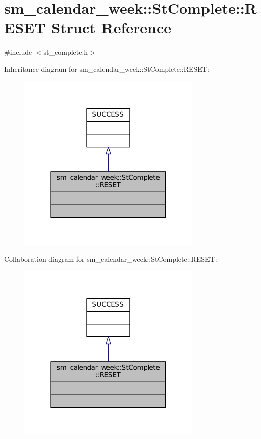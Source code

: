 \hypertarget{structsm__calendar__week_1_1StComplete_1_1RESET}{}\section{sm\+\_\+calendar\+\_\+week\+:\+:St\+Complete\+:\+:R\+E\+S\+ET Struct Reference}
\label{structsm__calendar__week_1_1StComplete_1_1RESET}


{\ttfamily \#include $<$st\+\_\+complete.\+h$>$}



Inheritance diagram for sm\+\_\+calendar\+\_\+week\+:\+:St\+Complete\+:\+:R\+E\+S\+ET\+:
\nopagebreak
\begin{figure}[H]
\begin{center}
\leavevmode
\includegraphics[width=250pt]{structsm__calendar__week_1_1StComplete_1_1RESET__inherit__graph}
\end{center}
\end{figure}


Collaboration diagram for sm\+\_\+calendar\+\_\+week\+:\+:St\+Complete\+:\+:R\+E\+S\+ET\+:
\nopagebreak
\begin{figure}[H]
\begin{center}
\leavevmode
\includegraphics[width=250pt]{structsm__calendar__week_1_1StComplete_1_1RESET__coll__graph}
\end{center}
\end{figure}


